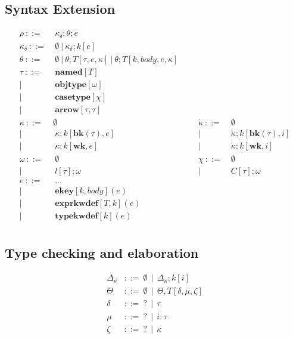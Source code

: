 \documentclass[letterpaper, notitlepage]{article}
\begin{document}
\subsection{Syntax Extension}
\begin{align*}
	\rho			~::=&~ \kappa_{\delta};\theta;e\\
	\kappa_{\delta}	~::=&~ \emptyset ~ | ~ \kappa_{\delta};k[e]\\
	\theta			~::=&~ \emptyset ~ | ~ \theta; T[\tau, e, \kappa] ~ | ~ \theta; T[k, body, e, \kappa]\\
	\tau 			~::=&~ \mathbf{named}[T]\\
					|~	& ~ \mathbf{objtype}[\omega]\\
					|~	& ~ \mathbf{casetype}[\chi]\\
					|~  & ~ \mathbf{arrow}[\tau, \tau]\\
	\kappa 			~::=& \emptyset											&	&	&\dot\kappa ~::=& ~\emptyset\\
					|~  & ~ \kappa;k[\mathbf{bk}(\tau),e]					&	&	&|~ & ~ \dot\kappa;k[\mathbf{bk}(\tau),i]\\
					|~  & ~ \kappa;k[\mathbf{wk},e]							& 	& 	&|~ & ~ \dot\kappa;k[\mathbf{wk},i]\\
	\omega 			~::=&~ \emptyset										& 	& 	&\chi 	~::=& ~\emptyset ~\\ 
					| ~ &~ l[\tau];\omega  									& 	&   &|~ & ~C[\tau];\omega\\ 
	e 				~::=&~ ...\\
					| ~ &~ \mathbf{ekey}[k,body](e)\\
					| ~ &~ \mathbf{exprkwdef}[T,k](e)\\
					| ~ &~ \mathbf{typekwdef}[k](e)\\
\end{align*}
\subsection{Type checking and elaboration}
\begin{align*}
	\Delta_{\kappa} &::=~ \emptyset ~~ | ~~ \Delta_{\kappa};k[i]\\
	\Theta &::=~ \emptyset ~~ | ~~ \Theta,T[\delta,\mu,\zeta] \\
	\delta &::=~ ? ~~ | ~~ \tau\\
	\mu	   &::=~ ? ~~ | ~~ i:\tau\\
		\zeta  &::=~ ? ~~ | ~~ \kappa\\
\end{align*}
\end{document}
